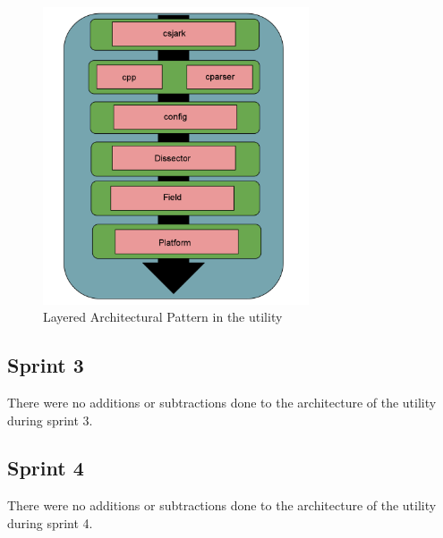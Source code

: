\begin{figure}[htb]
	\center
	\includegraphics[width=0.7\textwidth]{./planning/img/layered}
	\caption{Layered Architectural Pattern in the \Gls{utility}\label{fig:layered}}
\end{figure}

\subsection{Sprint 3}
There were no additions or subtractions done to the architecture of the utility during sprint 3.

\subsection{Sprint 4}
There were no additions or subtractions done to the architecture of the utility during sprint 4.

